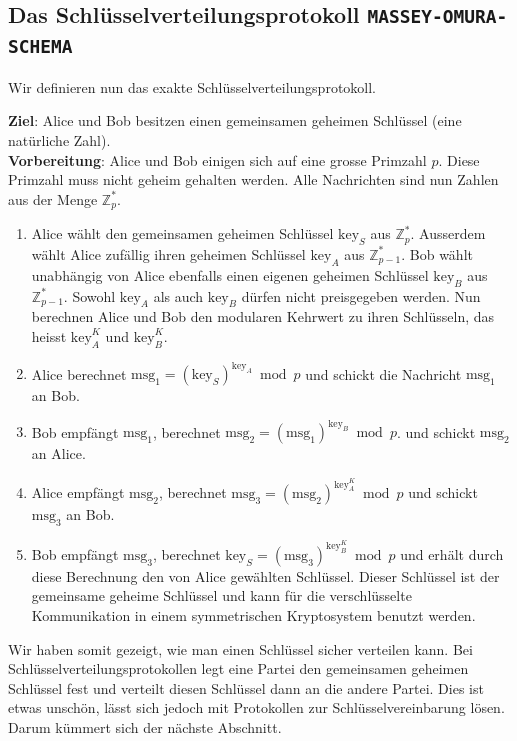\subsection{Das Schlüsselverteilungsprotokoll \texttt{MASSEY-OMURA-SCHEMA}}

Wir definieren nun das exakte Schlüsselverteilungsprotokoll.

\begin{definition}
\textbf{Ziel}: Alice und Bob besitzen einen gemeinsamen geheimen Schlüssel (eine natürliche Zahl). \\ \textbf{Vorbereitung}: Alice und Bob einigen sich auf eine grosse Primzahl $p$. Diese Primzahl muss nicht geheim gehalten werden. Alle Nachrichten sind nun Zahlen aus der Menge $\mathbb{Z}_{p}^*$.

\begin{enumerate}
	\item Alice wählt den gemeinsamen geheimen Schlüssel $\text{key}_S$ aus $\mathbb{Z}_{p}^*$. Ausserdem wählt Alice zufällig ihren geheimen Schlüssel $\text{key}_A$ aus $\mathbb{Z}_{p-1}^*$. Bob wählt unabhängig von Alice ebenfalls einen eigenen geheimen Schlüssel $\text{key}_B$ aus $\mathbb{Z}_{p-1}^*$. Sowohl $\text{key}_A$ als auch $\text{key}_B$ dürfen nicht preisgegeben werden. Nun berechnen Alice und Bob den modularen Kehrwert zu ihren Schlüsseln, das heisst $\text{key}_A^K$ und $\text{key}_B^K$.
	\item Alice berechnet $\text{msg}_1 = (\text{key}_S)^{\text{key}_A} \bmod p$ und schickt die Nachricht $\text{msg}_1$ an Bob.
	\item Bob empfängt $\text{msg}_1$, berechnet $\text{msg}_2 = (\text{msg}_1)^{\text{key}_B} \bmod p$. und schickt $\text{msg}_2$ an Alice.
	\item Alice empfängt $\text{msg}_2$, berechnet $\text{msg}_3 = (\text{msg}_2)^{\text{key}_A^K} \bmod p$ und schickt $\text{msg}_3$ an Bob.
	\item Bob empfängt $\text{msg}_3$, berechnet $\text{key}_S = (\text{msg}_3)^{\text{key}_B^K} \bmod p$ und erhält durch diese Berechnung den von Alice gewählten Schlüssel. Dieser Schlüssel ist der gemeinsame geheime Schlüssel und kann für die verschlüsselte Kommunikation in einem symmetrischen Kryptosystem benutzt werden. 
\end{enumerate}

\end{definition}

Wir haben somit gezeigt, wie man einen Schlüssel sicher verteilen kann. Bei Schlüsselverteilungsprotokollen legt eine Partei den gemeinsamen geheimen Schlüssel fest und verteilt diesen Schlüssel dann an die andere Partei. Dies ist etwas unschön, lässt sich jedoch mit Protokollen zur Schlüsselvereinbarung lösen. Darum kümmert sich der nächste Abschnitt.

